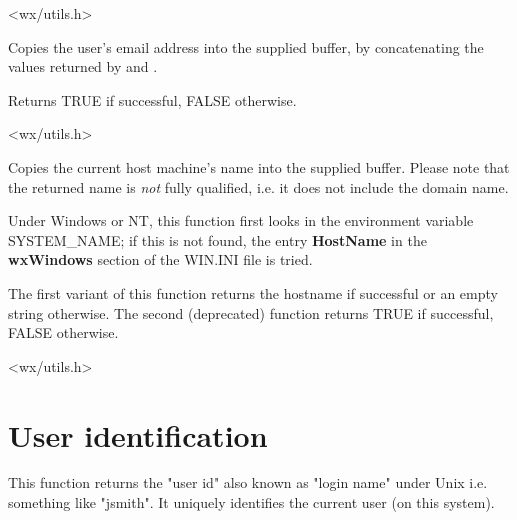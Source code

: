 <wx/utils.h>

\label{wxgetemailaddress}


Copies the user's email address into the supplied buffer, by
concatenating the values returned by \rtfsp
and .

Returns TRUE if successful, FALSE otherwise.


<wx/utils.h>

\label{wxgethostname}



Copies the current host machine's name into the supplied buffer. Please note
that the returned name is {\it not} fully qualified, i.e. it does not include
the domain name.

Under Windows or NT, this function first looks in the environment
variable SYSTEM\_NAME; if this is not found, the entry {\bf HostName}\rtfsp
in the {\bf wxWindows} section of the WIN.INI file is tried.

The first variant of this function returns the hostname if successful or an
empty string otherwise. The second (deprecated) function returns TRUE
if successful, FALSE otherwise.




<wx/utils.h>

\section{User identification}\label{useridfunctions}

\label{wxgetuserid}



This function returns the "user id" also known as "login name" under Unix i.e.
something like "jsmith". It uniquely identifies the current user (on this system).

